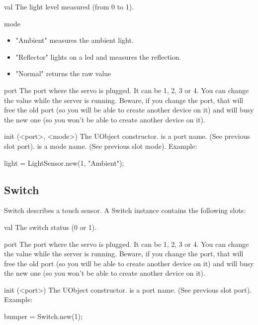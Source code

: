 \begin{urbiscriptapi}
\item[val] The light level measured (from 0 to 1).

\item[mode]
  \begin{itemize}
  \item "Ambient" measures the ambient light.
  \item "Reflector" lights on a led and measures the reflection.
  \item "Normal" returns the raw value
  \end{itemize}

\item[port] The port where the servo is plugged. It can be 1, 2, 3 or 4. You
  can change the value while the server is running. Beware, if you change
  the port, that will free the old port (so you will be able to create
  another device on it) and will busy the new one (so you won't be able to
  create another device on it).

\item[init](<port>, <mode>) The UObject constructor.  is a port
  name. (See previous slot port).  is a mode name. (See previous
  slot mode). Example:
\begin{urbiunchecked}
light = LightSensor.new(1, "Ambient");
\end{urbiunchecked}
\end{urbiscriptapi}

\subsection{Switch}

Switch describes a touch sensor. A Switch instance contains the following
slots:

\begin{urbiscriptapi}
\item[val] The switch status (0 or 1).

\item[port] The port where the servo is plugged. It can be 1, 2, 3 or 4. You
  can change the value while the server is running. Beware, if you change
  the port, that will free the old port (so you will be able to create
  another device on it) and will busy the new one (so you won't be able to
  create another device on it).

\item[init](<port>) The UObject constructor.  is a port name. (See
  previous slot port). Example:
\begin{urbiunchecked}
bumper = Switch.new(1);
\end{urbiunchecked}

\end{urbiscriptapi}

